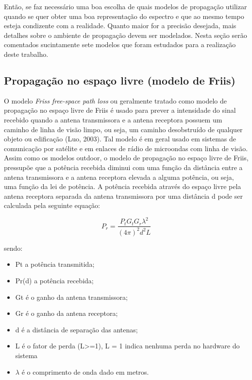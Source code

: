 \documentclass[
	12pt,				%
	openright,			%
	twoside,			%
	a4paper,			%
	english,			%
	french,				%
	spanish,			%
	brazil				%
	]{abntex2}
\begin{document}
Então, se faz necessário uma boa escolha de quais modelos de propagação utilizar quando se quer obter uma boa representação do espectro e que ao mesmo tempo esteja condizente com a realidade. Quanto maior for a precisão desejada, mais detalhes sobre o ambiente de propagação devem ser modelados. Nesta seção serão comentados sucintamente sete modelos que foram estudados para a realização deste trabalho.


\subsection[Propagação no espaço livre (modelo de Friis)]{Propagação no espaço livre (modelo de Friis)}

O modelo \textit{Friss free-space path loss} ou geralmente tratado como modelo de propagação no espaço livre de Friis é usado para prever a intensidade do sinal recebido quando a antena transmissora e a antena receptora possuem um caminho de linha de visão limpo, ou seja, um caminho desobstruído de qualquer objeto ou edificação (Luo, 2003). Tal modelo é em geral usado em sistemas de comunicação por satélite e em enlaces de rádio de microondas com linha de visão. Assim como os modelos outdoor, o modelo de propagação no espaço livre de Friis, pressupõe que a potência recebida diminui com uma função da distância entre a antena transmissora e a antena receptora elevada a alguma potência, ou seja, uma função da lei de potência. A potência recebida através do espaço livre pela antena receptora separada da antena transmissora por uma distância d pode ser calculada pela seguinte equação:


\begin{equation}
P_{r}= \frac{P_{t}G_{t}G_{r}\lambda^{2}}{(4\pi)^{2}d^{2}L}
\end{equation}

sendo:

\begin{itemize}
	\item Pt a potência transmitida;
	\item Pr(d) a potência recebida;
	\item Gt é o ganho da antena transmissora;
	\item Gr é o ganho da antena receptora;
	\item d é a distância de separação das antenas;
	\item L é o fator de perda (L>=1), L = 1 indica nenhuma perda no hardware do sistema
	\item $ \lambda $ é o comprimento de onda dado em metros.
\end{itemize}
\end{document}
